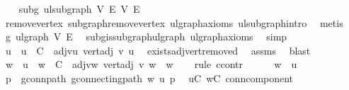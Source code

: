 \begin{isabellebody}
{\isacharminus}{\kern0pt}\isanewline
\ \ \isamarkupfalse%
\ subg{\isacharcolon}{\kern0pt}\ ulsubgraph\ V{\isacharprime}{\kern0pt}\ E{\isacharprime}{\kern0pt}\ V\ E\ \isamarkupfalse%
\ remove{\isacharunderscore}{\kern0pt}vertex\ subgraph{\isacharunderscore}{\kern0pt}remove{\isacharunderscore}{\kern0pt}vertex\ ulgraph{\isacharunderscore}{\kern0pt}axioms\ ulsubgraph{\isachardot}{\kern0pt}intro\ \isamarkupfalse%
\ metis\isanewline
\ \ \isamarkupfalse%
\ g{\isacharprime}{\kern0pt}{\isacharcolon}{\kern0pt}\ ulgraph\ V{\isacharprime}{\kern0pt}\ E{\isacharprime}{\kern0pt}\ \isamarkupfalse%
\ subg{\isachardot}{\kern0pt}is{\isacharunderscore}{\kern0pt}subgraph{\isacharunderscore}{\kern0pt}ulgraph\ ulgraph{\isacharunderscore}{\kern0pt}axioms\ \isamarkupfalse%
\ simp\isanewline
\ \ \isamarkupfalse%
\ u\ \ {\isachardoublequoteopen}u\ {\isasymin}\ C{\isachardoublequoteclose}\ \ adj{\isacharunderscore}{\kern0pt}vu{\isacharcolon}{\kern0pt}\ {\isachardoublequoteopen}vert{\isacharunderscore}{\kern0pt}adj\ v\ u{\isachardoublequoteclose}\ \isamarkupfalse%
\ exists{\isacharunderscore}{\kern0pt}adj{\isacharunderscore}{\kern0pt}vert{\isacharunderscore}{\kern0pt}removed\ \isamarkupfalse%
\ assms\ \isamarkupfalse%
\ blast\isanewline
\ \ \isamarkupfalse%
\ {\isachardoublequoteopen}w\ {\isacharequal}{\kern0pt}\ u{\isachardoublequoteclose}\ \ {\isachardoublequoteopen}w\ {\isasymin}\ C{\isachardoublequoteclose}\ \ adj{\isacharunderscore}{\kern0pt}vw{\isacharcolon}{\kern0pt}\ {\isachardoublequoteopen}vert{\isacharunderscore}{\kern0pt}adj\ v\ w{\isachardoublequoteclose}\ \ w\isanewline
\ \ \isamarkupfalse%
\ {\isacharparenleft}{\kern0pt}rule\ ccontr{\isacharparenright}{\kern0pt}\isanewline
\ \ \ \ \isamarkupfalse%
\ {\isachardoublequoteopen}w\ {\isasymnoteq}\ u{\isachardoublequoteclose}\isanewline
\ \ \ \ \isamarkupfalse%
\ p\ \ g{\isacharprime}{\kern0pt}{\isacharunderscore}{\kern0pt}conn{\isacharunderscore}{\kern0pt}path{\isacharcolon}{\kern0pt}\ {\isachardoublequoteopen}g{\isacharprime}{\kern0pt}{\isachardot}{\kern0pt}connecting{\isacharunderscore}{\kern0pt}path\ w\ u\ p{\isachardoublequoteclose}\ \isamarkupfalse%
\ {\isacartoucheopen}u{\isasymin}C{\isacartoucheclose}\ {\isacartoucheopen}w{\isasymin}C{\isacartoucheclose}\ conn{\isacharunderscore}{\kern0pt}component\isanewline

\end{isabellebody}
